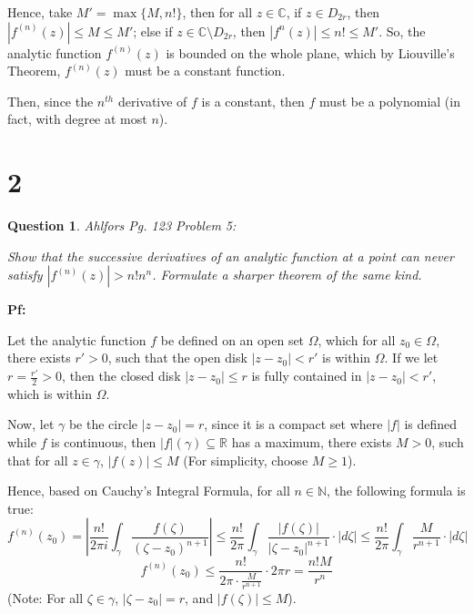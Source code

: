 \documentclass{article}
\newtheorem{question}{Question}
\begin{document}
Hence, take $M'=\max\{M, n!\}$, then for all $z\in\mathbb{C}$, if $z\in D_{2r}$, then $|f^{(n)}(z)| \leq M \leq M'$; else if $z\in \mathbb{C}\setminus D_{2r}$, then $|f^{n}(z)| \leq n! \leq M'$.
So, the analytic function $f^{(n)}(z)$ is bounded on the whole plane, which by Liouville's Theorem, $f^{(n)}(z)$ must be a constant function.

Then, since the $n^{th}$ derivative of $f$ is a constant, then $f$ must be a polynomial (in fact, with degree at most $n$).

\break

\section*{2}
\begin{myBox}[]{}
    \begin{question}
        Ahlfors Pg. 123 Problem 5:

        Show that the successive derivatives of an analytic function at a
        point can never satisfy $|f^{(n)}(z)| > n!n^n$. Formulate a sharper theorem of
        the same kind.
    \end{question}
\end{myBox}

\textbf{Pf:}

Let the analytic function $f$ be defined on an open set $\Omega$, which for all $z_0\in\Omega$, 
there exists $r'>0$, such that the open disk $|z-z_0| < r'$ is within $\Omega$. If we let $r=\frac{r'}{2}>0$,
then the closed disk $|z-z_0|\leq r$ is fully contained in $|z-z_0|<r'$, which is within $\Omega$.

\hfill

Now, let $\gamma$ be the circle $|z-z_0|=r$, since it is a compact set where $|f|$ is defined while $f$ is continuous,
then $|f|(\gamma)\subseteq \mathbb{R}$ has a maximum, there exists $M>0$, such that for all $z\in \gamma$, $|f(z)|\leq M$ (For simplicity, choose $M\geq 1$).

Hence, based on Cauchy's Integral Formula, for all $n\in\mathbb{N}$, the following formula is true:
$$f^{(n)}(z_0) = \left|\frac{n!}{2\pi i}\int_{\gamma}\frac{f(\zeta)}{(\zeta-z_0)^{n+1}}\right| \leq \frac{n!}{2\pi}\int_{\gamma}\frac{|f(\zeta)|}{|\zeta-z_0|^{n+1}}\cdot|d\zeta| \leq \frac{n!}{2\pi}\int_{\gamma}\frac{M}{r^{n+1}}\cdot|d\zeta|$$
$$f^{(n)}(z_0) \leq \frac{n!}{2\pi \cdot \frac{M}{r^{n+1}}}\cdot 2\pi r = \frac{n!M}{r^n}$$
(Note: For all $\zeta\in \gamma$, $|\zeta-z_0|=r$, and $|f(\zeta)|\leq M$).
\end{document}
